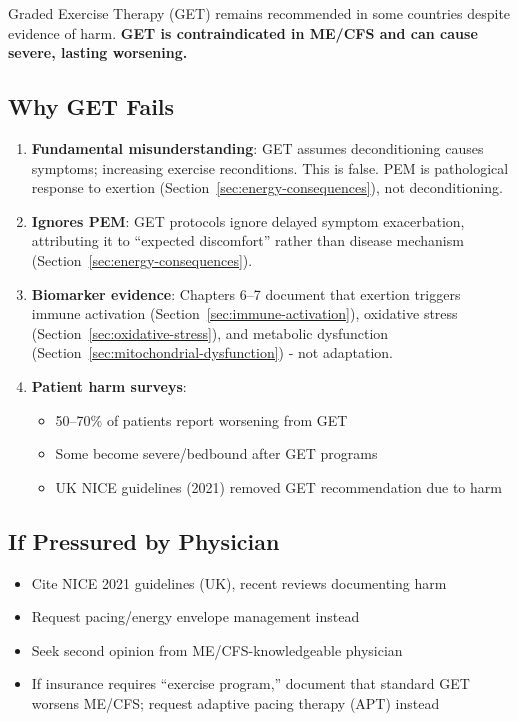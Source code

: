 Graded Exercise Therapy (GET) remains recommended in some countries despite evidence of harm. \textbf{GET is contraindicated in ME/CFS and can cause severe, lasting worsening.}

\subsection{Why GET Fails}

\begin{enumerate}
    \item \textbf{Fundamental misunderstanding}: GET assumes deconditioning causes symptoms; increasing exercise reconditions. This is false. PEM is pathological response to exertion (Section~\ref{sec:energy-consequences}), not deconditioning.

    \item \textbf{Ignores PEM}: GET protocols ignore delayed symptom exacerbation, attributing it to ``expected discomfort'' rather than disease mechanism (Section~\ref{sec:energy-consequences}).

    \item \textbf{Biomarker evidence}: Chapters 6--7 document that exertion triggers immune activation (Section~\ref{sec:immune-activation}), oxidative stress (Section~\ref{sec:oxidative-stress}), and metabolic dysfunction (Section~\ref{sec:mitochondrial-dysfunction}) - not adaptation.

    \item \textbf{Patient harm surveys}:
    \begin{itemize}
        \item 50--70\% of patients report worsening from GET~\cite{EatonFitch2019,Wilshire2018}
        \item Some become severe/bedbound after GET programs
        \item UK NICE guidelines (2021) removed GET recommendation due to harm~\cite{NICE2021mecfs}
    \end{itemize}
\end{enumerate}

\subsection{If Pressured by Physician}

\begin{itemize}
    \item Cite NICE 2021 guidelines (UK), recent reviews documenting harm
    \item Request pacing/energy envelope management instead
    \item Seek second opinion from ME/CFS-knowledgeable physician
    \item If insurance requires ``exercise program,'' document that standard GET worsens ME/CFS; request adaptive pacing therapy (APT) instead
\end{itemize}

